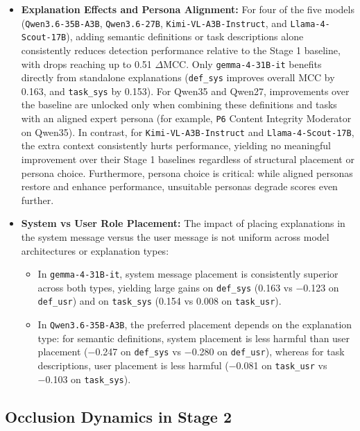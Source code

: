 \begin{itemize}
    \item \textbf{Explanation Effects and Persona Alignment:} For four of the five models (\texttt{Qwen3.6-35B-A3B}, \texttt{Qwen3.6-27B}, \texttt{Kimi-VL-A3B-Instruct}, and \texttt{Llama-4-Scout-17B}), adding semantic definitions or task descriptions alone consistently reduces detection performance relative to the Stage 1 baseline, with drops reaching up to \num{0.51} $\Delta\text{MCC}$. Only \texttt{gemma-4-31B-it} benefits directly from standalone explanations (\texttt{def\_sys} improves overall MCC by \num{+0.163}, and \texttt{task\_sys} by \num{+0.153}). For Qwen35 and Qwen27, improvements over the baseline are unlocked only when combining these definitions and tasks with an aligned expert persona (for example, \texttt{P6} Content Integrity Moderator on Qwen35). In contrast, for \texttt{Kimi-VL-A3B-Instruct} and \texttt{Llama-4-Scout-17B}, the extra context consistently hurts performance, yielding no meaningful improvement over their Stage 1 baselines regardless of structural placement or persona choice. Furthermore, persona choice is critical: while aligned personas restore and enhance performance, unsuitable personas degrade scores even further.
    \item \textbf{System vs User Role Placement:} The impact of placing explanations in the system message versus the user message is not uniform across model architectures or explanation types:
    \begin{itemize}
        \item In \texttt{gemma-4-31B-it}, system message placement is consistently superior across both types, yielding large gains on \texttt{def\_sys} (\num{+0.163} vs \num{-0.123} on \texttt{def\_usr}) and on \texttt{task\_sys} (\num{+0.154} vs \num{+0.008} on \texttt{task\_usr}).
        \item In \texttt{Qwen3.6-35B-A3B}, the preferred placement depends on the explanation type: for semantic definitions, system placement is less harmful than user placement (\num{-0.247} on \texttt{def\_sys} vs \num{-0.280} on \texttt{def\_usr}), whereas for task descriptions, user placement is less harmful (\num{-0.081} on \texttt{task\_usr} vs \num{-0.103} on \texttt{task\_sys}).
    \end{itemize}
\end{itemize}

\subsection{Occlusion Dynamics in Stage 2}
\label{subsec:stage2_occlusion}

